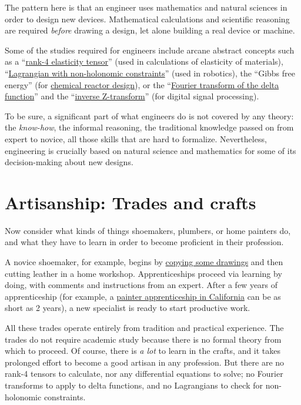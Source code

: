 The pattern here is that an engineer uses mathematics and natural
sciences in order to design new devices. Mathematical calculations
and scientific reasoning are required \emph{before} drawing a design,
let alone building a real device or machine.

Some of the studies required for engineers include arcane abstract
concepts such as a ``\href{https://serc.carleton.edu/NAGTWorkshops/mineralogy/mineral_physics/tensors.html}{rank-4 elasticity tensor}''
(used in calculations of elasticity of materials), ``\href{https://arxiv.org/abs/math/0008147}{Lagrangian with non-holonomic constraints}''
(used in robotics), the ``Gibbs free energy'' (for \href{https://www.amazon.com/Introduction-Chemical-Engineering-Kinetics-Reactor/dp/1118368258}{chemical reactor design}),
or the ``\href{https://www.youtube.com/watch?v=KAbqISZ6SHQ}{Fourier transform of the delta function}''
and the ``\href{https://ocw.mit.edu/resources/res-6-008-digital-signal-processing-spring-2011/video-lectures/lecture-6-the-inverse-z-transform/}{inverse Z-transform}''
(for digital signal processing).

To be sure, a significant part of what engineers do is not covered
by any theory: the \emph{know-how}, the informal reasoning, the traditional
knowledge passed on from expert to novice,  \textendash{}  all those
skills that are hard to formalize. Nevertheless, engineering is crucially
based on natural science and mathematics for some of its decision-making
about new designs.

\section{Artisanship: Trades and crafts }

Now consider what kinds of things shoemakers, plumbers, or home painters
do, and what they have to learn in order to become proficient in their
profession.

A novice shoemaker, for example, begins by \href{https://youtu.be/cY5MY0czMAk?t=141}{copying some drawings}
and then cutting leather in a home workshop. Apprenticeships proceed
via learning by doing, with comments and instructions from an expert.
After a few years of apprenticeship (for example, a \href{http://www.calapprenticeship.org/programs/painter_apprenticeship.php}{painter apprenticeship in California}
can be as short as 2 years), a new specialist is ready to start productive
work. 

All these trades operate entirely from tradition and practical experience.
The trades do not require academic study because there is no formal
theory from which to proceed. Of course, there is \emph{a lot} to
learn in the crafts, and it takes prolonged effort to become a good
artisan in any profession. But there are no rank-4 tensors to calculate,
nor any differential equations to solve; no Fourier transforms to
apply to delta functions, and no Lagrangians to check for non-holonomic
constraints.


